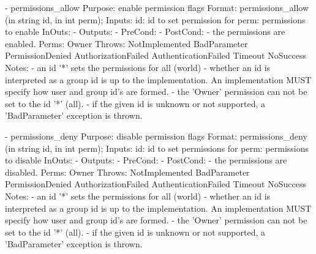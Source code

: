  \begin{myspec}
    - permissions_allow
      Purpose:  enable permission flags
      Format:   permissions_allow    (in  string     id,
                                      in  int        perm);
      Inputs:   id:                   id to set permission for
                perm:                 permissions to enable
      InOuts:   -
      Outputs:  -
      PreCond:  -
      PostCond: - the permissions are enabled.
      Perms:    Owner
      Throws:   NotImplemented
                BadParameter
                PermissionDenied
                AuthorizationFailed
                AuthenticationFailed
                Timeout
                NoSuccess
      Notes:    - an id '*' sets the permissions for all (world)
                - whether an id is interpreted as a group id is up to
                  the implementation.  An implementation MUST
                  specify how user and group id's are formed.
                - the 'Owner' permission can not be set to the
                  id '*' (all).
                - if the given id is unknown or not supported, a
                  'BadParameter' exception is thrown.
 
 
    - permissions_deny
      Purpose:  disable permission flags
      Format:   permissions_deny     (in  string     id,
                                      in  int        perm);
      Inputs:   id:                   id to set permissions for
                perm:                 permissions to disable
      InOuts:   -
      Outputs:  -
      PreCond:  -
      PostCond: - the permissions are disabled.
      Perms:    Owner
      Throws:   NotImplemented
                BadParameter
                PermissionDenied
                AuthorizationFailed
                AuthenticationFailed
                Timeout
                NoSuccess
      Notes:    - an id '*' sets the permissions for all (world)
                - whether an id is interpreted as a group id is up to
                  the implementation.  An implementation MUST
                  specify how user and group id's are formed.
                - the 'Owner' permission can not be set to the
                  id '*' (all).
                - if the given id is unknown or not supported, a
                  'BadParameter' exception is thrown.
 

\end{myspec}
